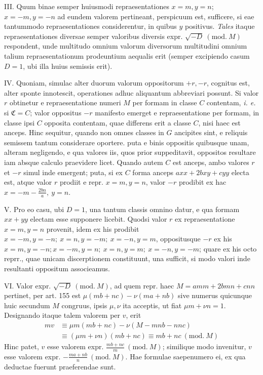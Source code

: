 III. Quum binae semper huiusmodi repraesentationes \(x=m,\allowbreak y=n\); \(x=-m,\allowbreak y=-n\) ad eundem valorem pertineant, perspicuum est, sufficere, si eae tantummodo repraesentationes considerentur, in quibus \(y\) positivus. \textit{Tales} itaque repraesentationes diversae semper valoribus diversis expr. \(\surd{-D}\ (\mathrm{mod.}\ M)\) respondent, unde multitudo omnium valorum diversorum multitudini omnium talium repraesentationum prodeuntium aequalis erit (semper excipiendo casum \(D=1\), ubi illa huius semissis erit).

IV. Quoniam, simulac alter duorum valorum oppositorum \(+r,\allowbreak -r\), cognitus est, alter sponte innotescit, operationes adhuc aliquantum abbreviari possunt. Si valor \(r\) obtinetur e repraesentatione numeri \(M\) per formam in classe \(C\) contentam, \textit{i. e.} si \(\mathfrak C=C\); valor oppositus \(-r\) manifesto emerget e repraesentatione per formam, in classe ipsi \(C\) opposita contentam, quae differens erit a classe \(C\), nisi haec est anceps. Hinc sequitur, quando non omnes classes in \(G\) ancipites sint, e reliquis semissem tantum considerare oportere. puta e binis oppositis quibusque unam, alteram negligendo, e qua valores iis, quos prior suppeditavit, oppositos resultare iam absque calculo praevidere licet. Quando autem \(C\) est anceps, ambo valores \(r\) et \(-r\) simul inde emergent; puta, si ex \(C\) forma anceps
\(axx+2bxy+cyy\) electa est, atque valor \(r\) prodiit e repr. \(x=m,\allowbreak y=n\), valor \(-r\) prodibit ex hac \(x=-m-\frac{2bn}{a},\allowbreak \ y=n\).

V. Pro eo casu, ubi \(D=1\), una tantum classis omnino datur, e qua formam \(xx+yy\) electam esse supponere licebit. Quodsi valor \(r\) ex repraesentatione \(x=m,\allowbreak y=n\) provenit, idem ex his prodibit \(x=-m,\allowbreak y=-n;\allowbreak \ x=n,\allowbreak y=-m;\allowbreak \ x=-n,\allowbreak y=m\), oppositusque \(-r\) ex his \(x=m,\allowbreak y=-n;\allowbreak x=-m,\allowbreak y=n;\allowbreak \ x=n,\allowbreak y=m;\allowbreak \ x=-n,\allowbreak y=-m\); quare ex his octo reprr., quae unicam discerptionem constituunt, una sufficit, si modo valori inde resultanti oppositum associeamus.

VI. Valor expr. \(\surd{-D}\ (\mathrm{mod.}\ M)\), ad quem repr. haec \(M=amm+2bmn+cnn\) pertinet, per art. 155 est \(\mu(mb+nc)-\nu(ma+nb)\) sive numerus quicunque huic secundum \(M\) congruus, ipsis \(\mu,\allowbreak \nu\) ita acceptis, ut fiat \(\mu m+\nu n=1\). Designando itaque talem valorem per \(v\), erit \[\begin{aligned}
mv&\equiv\mu m(mb+nc)-\nu(M-mnb-nnc)\\
&\equiv(\mu m+\nu n)(mb+nc)\equiv mb+nc\ (\mathrm{mod.}\ M)
\end{aligned}\] Hinc patet, \(v\) esse valorem expr. \(\frac{mb+nc}{m}\ (\mathrm{mod.}\ M)\); similique modo invenitur, \(v\) esse valorem expr. \(-\frac{ma+nb}{n}\ (\mathrm{mod.}\ M)\). Hae formulae saepenumero ei, ex qua deductae fuerunt praeferendae sunt.

